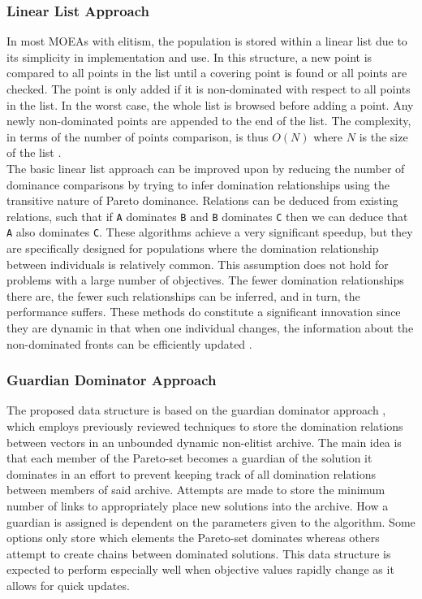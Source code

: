 \documentclass{ecmm427_assignment}
\begin{document}
\subsubsection{Linear List Approach}
In most MOEAs with elitism, the population is stored within a linear list due to its simplicity in implementation and use. In this structure, a new point is compared to all points in the list until a covering point is found or all points are checked. The point is only added if it is non-dominated with respect to all points in the list. In the worst case, the whole list is browsed before adding a point. Any newly non-dominated points are appended to the end of the list. The complexity, in terms of the number of points comparison, is thus $O(N)$ where $N$ is the size of the list \cite{Yuen2012} \cite{Glasmachers2017}  \cite{Jaszkiewicz2016} \cite{Shi2009}.\\
The basic linear list approach can be improved upon by reducing the number of dominance comparisons by trying to infer domination relationships using the transitive nature of Pareto dominance. Relations can be deduced from existing relations, such that if \texttt{A} dominates \texttt{B} and \texttt{B} dominates \texttt{C} then we can deduce that \texttt{A} also dominates \texttt{C}. These algorithms achieve a very significant speedup, but they are specifically designed for populations where the domination relationship between individuals is relatively common. This assumption does not hold for problems with a large number of objectives. The fewer domination relationships there are, the fewer such relationships can be inferred, and in turn, the performance suffers. These methods do constitute a significant innovation since they are dynamic in that when one individual changes, the information about the non-dominated fronts can be efficiently updated \cite{Fieldsend2014} \cite{Drozdik2015} \cite{Shi2009}.

\subsubsection{Guardian Dominator Approach}
The proposed data structure is based on the guardian dominator approach \cite{Fieldsend2014}, which employs previously reviewed techniques to store the domination relations between vectors in an unbounded dynamic non-elitist archive. The main idea is that each member of the Pareto-set becomes a guardian of the solution it dominates in an effort to prevent keeping track of all domination relations between members of said archive. Attempts are made to store the minimum number of links to appropriately place new solutions into the archive. How a guardian is assigned is dependent on the parameters given to the algorithm. Some options only store which elements the Pareto-set dominates whereas others attempt to create chains between dominated solutions. This data structure is expected to perform especially well when objective values rapidly change as it allows for quick updates.
\end{document}
